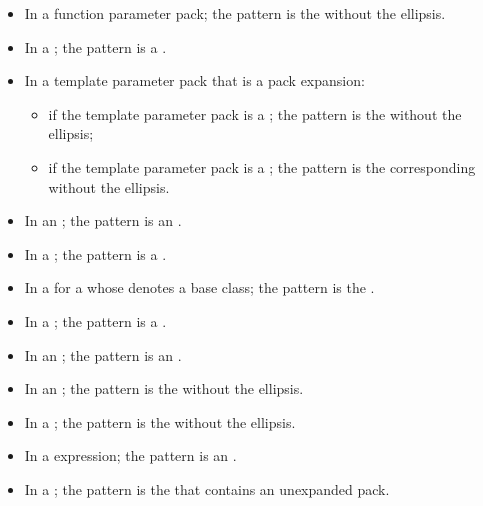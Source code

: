 \begin{itemize}
\item In a function parameter pack; the pattern is the
 without the ellipsis.

\item In a ;
the pattern is a .

\item In a template parameter pack that is a pack expansion:
\begin{itemize}
\item
if the template parameter pack is a ;
the pattern is the  without the ellipsis;

\item
if the template parameter pack is a ;
the pattern is the corresponding 
without the ellipsis.
\end{itemize}

\item In an ;
the pattern is an .

\item In a ;
the pattern is a .

\item In a  for a
 whose  denotes a
base class; the pattern is the .

\item In a ;
the pattern is a .

\item In an ; the pattern is
an .

\item In an ; the pattern is
the  without the ellipsis.

\item In a ; the pattern is
the  without the ellipsis.

\item In a  expression; the pattern is an
.

\item In a ;
the pattern is the 
that contains an unexpanded pack.
\end{itemize}

